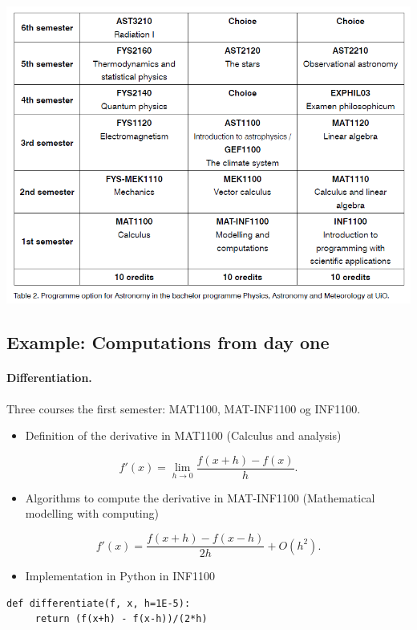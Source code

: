 \documentclass[%
twoside,                 %
final,                   %
10pt]{article}
\begin{document}
\paragraph{}


\centerline{\includegraphics[width=0.6\linewidth]{figures/astronomy.png}}




\subsection*{Example: Computations from day one}

\paragraph{Differentiation.}
Three courses the first semester:  MAT1100, MAT-INF1100 og INF1100.
\begin{itemize}
\item Definition  of the derivative in  MAT1100 (Calculus and analysis) 
\end{itemize}

\noindent
\[
 f'(x)=\lim_{h \rightarrow 0}\frac{f(x+h)-f(x)}{h}.
\]
\begin{itemize}
\item Algorithms to compute the derivative in MAT-INF1100  (Mathematical modelling with computing)
\end{itemize}

\noindent
\[
 f'(x)= \frac{f(x+h)-f(x-h)}{2h}+O(h^2).
\]
\begin{itemize}
\item Implementation in Python in INF1100
\end{itemize}

\noindent
\begin{verbatim}
def differentiate(f, x, h=1E-5):
     return (f(x+h) - f(x-h))/(2*h)
\end{verbatim}
\end{document}
